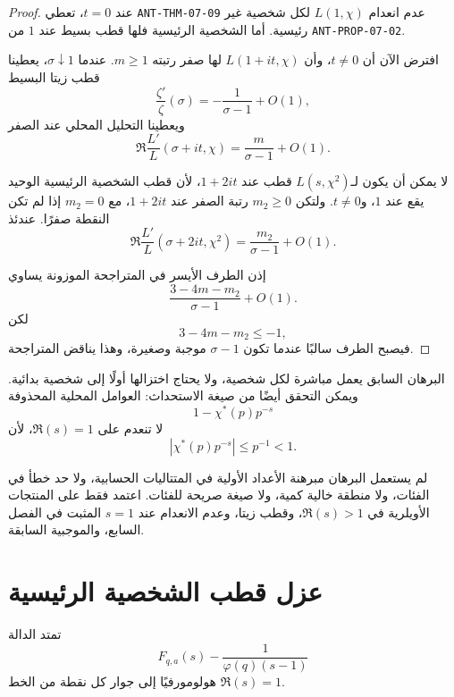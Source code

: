 \begin{proof}
عند \(t=0\)، تعطي
\textenglish{\texttt{ANT-THM-07-09}} عدم انعدام \(L(1,\chi)\) لكل شخصية
غير رئيسية. أما الشخصية الرئيسية فلها قطب بسيط عند \(1\) من
\textenglish{\texttt{ANT-PROP-07-02}}.

افترض الآن أن \(t\ne0\)، وأن \(L(1+it,\chi)\) لها صفر رتبته
\(m\ge1\). عندما \(\sigma\downarrow1\)، يعطينا قطب زيتا البسيط
\[
\frac{\zeta'}{\zeta}(\sigma)
=-\frac1{\sigma-1}+O(1),
\]
ويعطينا التحليل المحلي عند الصفر
\[
\Re\frac{L'}{L}(\sigma+it,\chi)
=
\frac{m}{\sigma-1}+O(1).
\]

لا يمكن أن يكون لـ\(L(s,\chi^2)\) قطب عند \(1+2it\)، لأن قطب الشخصية
الرئيسية الوحيد يقع عند \(1\)، و\(t\ne0\). ولتكن \(m_2\ge0\) رتبة الصفر
عند \(1+2it\)، مع \(m_2=0\) إذا لم تكن النقطة صفرًا. عندئذ
\[
\Re\frac{L'}{L}(\sigma+2it,\chi^2)
=
\frac{m_2}{\sigma-1}+O(1).
\]

إذن الطرف الأيسر في المتراجحة الموزونة يساوي
\[
\frac{3-4m-m_2}{\sigma-1}+O(1).
\]
لكن
\[
3-4m-m_2\le-1,
\]
فيصبح الطرف سالبًا عندما تكون \(\sigma-1\) موجبة وصغيرة، وهذا يناقض
المتراجحة.
\end{proof}

\begin{remark}
البرهان السابق يعمل مباشرة لكل شخصية، ولا يحتاج اختزالها أولًا إلى شخصية
بدائية. ويمكن التحقق أيضًا من صيغة الاستحداث: العوامل المحلية المحذوفة
\[
1-\chi^*(p)p^{-s}
\]
لا تنعدم على \(\Re(s)=1\)، لأن
\[
|\chi^*(p)p^{-s}|\le p^{-1}<1.
\]
\end{remark}

\begin{remark}
لم يستعمل البرهان مبرهنة الأعداد الأولية في المتتاليات الحسابية، ولا حد
خطأ في الفئات، ولا منطقة خالية كمية، ولا صيغة صريحة للفئات. اعتمد فقط على
المنتجات الأويلرية في \(\Re(s)>1\)، وقطب زيتا، وعدم الانعدام عند
\(s=1\) المثبت في الفصل السابع، والموجبية السابقة.
\end{remark}

\section{عزل قطب الشخصية الرئيسية}

\begin{proposition}
\label{prop:class-series-pole-removal}
\provedhere
تمتد الدالة
\[
F_{q,a}(s)-\frac1{\varphi(q)(s-1)}
\]
هولومورفيًا إلى جوار كل نقطة من الخط \(\Re(s)=1\).
\end{proposition}

